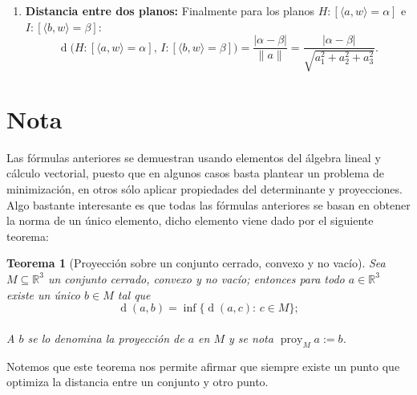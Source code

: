 \documentclass[11pt, a4paper]{article} %
\newtheorem{teo}{Teorema}
\newcommand{\R}{\mathbb{R}}
\DeclareMathOperator{\proy}{proy}
\DeclareMathOperator{\dd}{d}
\begin{document}
\begin{enumerate}[label = \textbf{\arabic*.}]
            
\item \textbf{Distancia entre dos planos:} Finalmente para los planos  \( H:[\langle a,w \rangle = \alpha] \) e  \( I: [\langle b,w\rangle=\beta]\):
\[
			\dd \big(  H: [ \langle a,w \rangle = \alpha ], \, I : [\langle b,w \rangle = \beta] \big) =\dfrac{ | \alpha - \beta | }{\|a\|}=\dfrac{|\alpha-\beta|}{ \sqrt{a_1^2 + a_2^2 + a_3^2} }.	\]
            
\end{enumerate}

\section*{Nota}
Las fórmulas anteriores se demuestran usando elementos del álgebra lineal y cálculo vectorial, puesto que en algunos casos basta plantear un problema de minimización, en otros sólo aplicar propiedades del determinante y proyecciones. Algo bastante interesante es que todas las fórmulas anteriores se basan en obtener la norma de un único elemento, dicho elemento viene dado por el siguiente teorema:
\begin{teo}[Proyección sobre un conjunto cerrado, convexo y no vacío]
Sea \(M \subseteq \R^{3}\) un conjunto cerrado, convexo y no vacío; entonces para todo \(a\in \R^3\) existe un único \(b\in M\) tal que \[\dd (a,b) = \inf \big\{ \dd(a,c): \, c \in M  \big\};\] \\

A \(b\) se lo denomina la \emph{proyección} de \(a\) en \(M\) y se nota
\( \proy_M a := b\).
\end{teo}

Notemos que este teorema nos permite afirmar que siempre existe un punto que optimiza la distancia entre un conjunto y otro punto.
\end{document}
